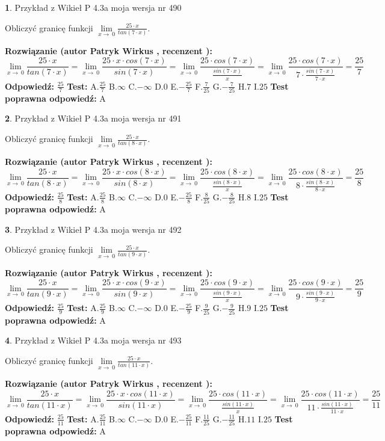 \documentclass[12pt, a4paper]{article}
\theoremstyle{definition} %
\newtheorem{zad}{}
\newcommand{\zadStart}[1]{\begin{zad}#1\newline}
\newcommand{\zadStop}{\end{zad}}
\newcommand{\rozwStart}[2]{\noindent \textbf{Rozwiązanie (autor #1 , recenzent #2): }\newline}
\newcommand{\rozwStop}{\newline}
\newcommand{\odpStart}{\noindent \textbf{Odpowiedź:}\newline}
\newcommand{\odpStop}{\newline}
\newcommand{\testStart}{\noindent \textbf{Test:}\newline}
\newcommand{\testStop}{\newline}
\newcommand{\kluczStart}{\noindent \textbf{Test poprawna odpowiedź:}\newline}
\newcommand{\kluczStop}{\newline}
\begin{document}
\zadStart{Przykład z Wikieł P 4.3a moja wersja nr 490}


Obliczyć granicę funkcji $\lim\limits_{x\to\ 0}\frac{25 \cdot x}{tan(7 \cdot x)}$.
\zadStop
\rozwStart{Patryk Wirkus}{}
$$\lim\limits_{x\to\ 0}\frac{25 \cdot x}{tan(7 \cdot x)}=\lim\limits_{x\to\ 0}\frac{25 \cdot x \cdot cos(7 \cdot x)}{sin(7 \cdot x)}=\lim\limits_{x\to\ 0}\frac{25 \cdot cos(7 \cdot x)}{\frac{sin(7 \cdot x)}{x}}=\lim\limits_{x\to\ 0}\frac{25 \cdot cos(7 \cdot x)}{7 \cdot \frac{sin(7 \cdot x)}{7 \cdot x}} = \frac{25}{7}$$
\rozwStop
\odpStart
$\frac{25}{7}$
\odpStop
\testStart
A.$\frac{25}{7}$
B.$\infty$
C.$-\infty$
D.$0$
E.$-\frac{25}{7}$
F.$\frac{7}{25}$
G.$-\frac{7}{25}$
H.$7$
I.$25$
\testStop
\kluczStart
A
\kluczStop



\zadStart{Przykład z Wikieł P 4.3a moja wersja nr 491}


Obliczyć granicę funkcji $\lim\limits_{x\to\ 0}\frac{25 \cdot x}{tan(8 \cdot x)}$.
\zadStop
\rozwStart{Patryk Wirkus}{}
$$\lim\limits_{x\to\ 0}\frac{25 \cdot x}{tan(8 \cdot x)}=\lim\limits_{x\to\ 0}\frac{25 \cdot x \cdot cos(8 \cdot x)}{sin(8 \cdot x)}=\lim\limits_{x\to\ 0}\frac{25 \cdot cos(8 \cdot x)}{\frac{sin(8 \cdot x)}{x}}=\lim\limits_{x\to\ 0}\frac{25 \cdot cos(8 \cdot x)}{8 \cdot \frac{sin(8 \cdot x)}{8 \cdot x}} = \frac{25}{8}$$
\rozwStop
\odpStart
$\frac{25}{8}$
\odpStop
\testStart
A.$\frac{25}{8}$
B.$\infty$
C.$-\infty$
D.$0$
E.$-\frac{25}{8}$
F.$\frac{8}{25}$
G.$-\frac{8}{25}$
H.$8$
I.$25$
\testStop
\kluczStart
A
\kluczStop



\zadStart{Przykład z Wikieł P 4.3a moja wersja nr 492}


Obliczyć granicę funkcji $\lim\limits_{x\to\ 0}\frac{25 \cdot x}{tan(9 \cdot x)}$.
\zadStop
\rozwStart{Patryk Wirkus}{}
$$\lim\limits_{x\to\ 0}\frac{25 \cdot x}{tan(9 \cdot x)}=\lim\limits_{x\to\ 0}\frac{25 \cdot x \cdot cos(9 \cdot x)}{sin(9 \cdot x)}=\lim\limits_{x\to\ 0}\frac{25 \cdot cos(9 \cdot x)}{\frac{sin(9 \cdot x)}{x}}=\lim\limits_{x\to\ 0}\frac{25 \cdot cos(9 \cdot x)}{9 \cdot \frac{sin(9 \cdot x)}{9 \cdot x}} = \frac{25}{9}$$
\rozwStop
\odpStart
$\frac{25}{9}$
\odpStop
\testStart
A.$\frac{25}{9}$
B.$\infty$
C.$-\infty$
D.$0$
E.$-\frac{25}{9}$
F.$\frac{9}{25}$
G.$-\frac{9}{25}$
H.$9$
I.$25$
\testStop
\kluczStart
A
\kluczStop



\zadStart{Przykład z Wikieł P 4.3a moja wersja nr 493}


Obliczyć granicę funkcji $\lim\limits_{x\to\ 0}\frac{25 \cdot x}{tan(11 \cdot x)}$.
\zadStop
\rozwStart{Patryk Wirkus}{}
$$\lim\limits_{x\to\ 0}\frac{25 \cdot x}{tan(11 \cdot x)}=\lim\limits_{x\to\ 0}\frac{25 \cdot x \cdot cos(11 \cdot x)}{sin(11 \cdot x)}=\lim\limits_{x\to\ 0}\frac{25 \cdot cos(11 \cdot x)}{\frac{sin(11 \cdot x)}{x}}=\lim\limits_{x\to\ 0}\frac{25 \cdot cos(11 \cdot x)}{11 \cdot \frac{sin(11 \cdot x)}{11 \cdot x}} = \frac{25}{11}$$
\rozwStop
\odpStart
$\frac{25}{11}$
\odpStop
\testStart
A.$\frac{25}{11}$
B.$\infty$
C.$-\infty$
D.$0$
E.$-\frac{25}{11}$
F.$\frac{11}{25}$
G.$-\frac{11}{25}$
H.$11$
I.$25$
\testStop
\kluczStart
A
\kluczStop
\end{document}
